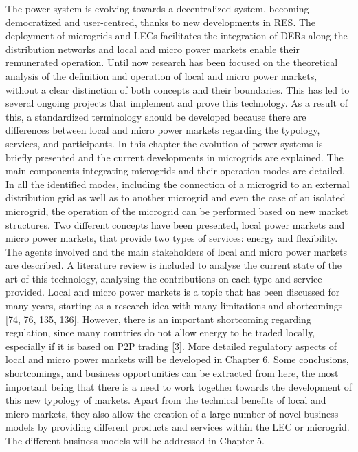 The power system is evolving towards a decentralized system, becoming democratized and user-centred, thanks to new developments in RES. The deployment of microgrids and LECs facilitates the integration of DERs along the distribution networks and local and micro power markets enable their remunerated operation. Until now research has been focused on the theoretical analysis of the definition and operation of local and micro power markets, without a clear distinction of both concepts and their boundaries. This has led to several ongoing projects that implement and prove this technology. As a result of this, a standardized terminology should be developed because there are differences between local and micro power markets regarding the typology, services, and participants.
In this chapter the evolution of power systems is briefly presented and the current developments in microgrids are explained. The main components integrating microgrids and their operation modes are detailed. In all the identified modes, including the connection of a microgrid to an external distribution grid as well as to another microgrid and even the case of an isolated microgrid, the operation of the microgrid can be performed based on new market structures. Two different concepts have been presented, local power markets and micro power markets, that provide two types of services: energy and flexibility. The agents involved and the main stakeholders of local and micro power markets are described. A literature review is included to analyse the current state of the art of this technology, analysing the contributions on each type and service provided.
Local and micro power markets is a topic that has been discussed for many years, starting as a research idea with many limitations and shortcomings [74, 76, 135, 136]. However, there is an important shortcoming regarding regulation, since many countries do not allow energy to be traded locally, especially if it is based on P2P trading [3]. More detailed regulatory aspects of local and micro power markets will be developed in Chapter 6. Some conclusions, shortcomings, and business opportunities can be extracted from here, the most important being that there is a need to work together towards the development of this new typology of markets. 
Apart from the technical benefits of local and micro markets, they also allow the creation of a large number of novel business models by providing different products and services within the LEC or microgrid. The different business models will be addressed in Chapter 5.

